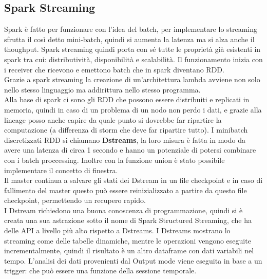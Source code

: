 \documentclass[11pt, twocolumn]{article}
\begin{document}
\subsection{Spark Streaming}
Spark è fatto per funzionare con l'idea del batch, per implementare lo streaming sfrutta il così detto mini-batch, quindi si aumenta la latenza ma si alza anche il thoughput. 
Spark streaming quindi porta con sé tutte le proprietà già esistenti in spark tra cui: distributività, disponibilità e scalabilità.
Il funzionamento inizia con i receiver che ricevono e emettono batch che in spark diventano RDD.\\
Grazie a spark streaming la creazione di un'architettura lambda avviene non solo nello stesso linguaggio ma addirittura nello stesso programma.\\
Alla base di spark ci sono gli RDD che possono essere distribuiti e replicati in memoria, quindi in caso di un problema di un nodo non perdo i dati, e grazie alla lineage posso anche capire da quale punto si dovrebbe far ripartire la computazione (a differenza di storm che deve far ripartire tutto).
I minibatch discretizzati RDD si chiamano \textbf{Dstreams}, la loro misura è fatta in modo da avere una latenza di circa 1 secondo e hanno un potenziale di potersi combinare con i batch proccessing.
Inoltre con la funzione union è stato possibile implementare il concetto di finestra.\\
Il master continua a salvare gli stati dei Dstream in un file checkpoint e in caso di fallimento del master questo può essere reinizializzato a partire da questo file checkpoint, permettendo un recupero rapido.\\
I Dstream richiedono una buona conoscenza di programmazione, quindi si è creata una sua astrazione sotto il nome di Spark Structured Streaming, che ha delle API a livello più alto rispetto a Dstreams.
I Dstreams mostrano lo streaming come delle tabelle dinamiche, mentre le operazioni vengono eseguite incrementalmente, quindi il risultato è un altro dataframe con dati variabili nel tempo.
L'analisi dei dati provenienti dal Output mode viene eseguita in base a un trigger: che può essere una funzione della sessione temporale.
\end{document}

